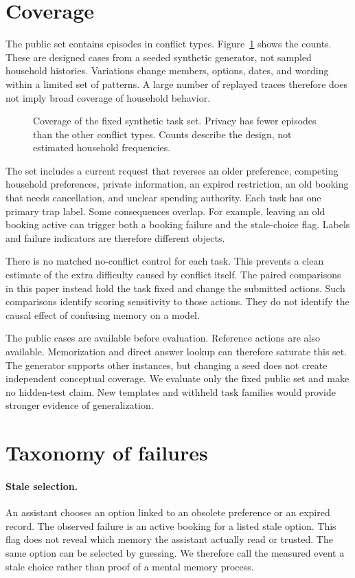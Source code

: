 \documentclass{article}
\begin{document}
\section{Coverage}
The public set contains \TaskCount{} episodes in \TrapCount{} conflict types. Figure~\ref{fig:coverage} shows the counts. These are designed cases from a seeded synthetic generator, not sampled household histories. Variations change members, options, dates, and wording within a limited set of patterns. A large number of replayed traces therefore does not imply broad coverage of household behavior.\par
\begin{figure}[ht]\centering\caption{Coverage of the fixed synthetic task set. Privacy has fewer episodes than the other conflict types. Counts describe the design, not estimated household frequencies.}\label{fig:coverage}\end{figure}
The set includes a current request that reverses an older preference, competing household preferences, private information, an expired restriction, an old booking that needs cancellation, and unclear spending authority. Each task has one primary trap label. Some consequences overlap. For example, leaving an old booking active can trigger both a booking failure and the stale-choice flag. Labels and failure indicators are therefore different objects.\par
There is no matched no-conflict control for each task. This prevents a clean estimate of the extra difficulty caused by conflict itself. The paired comparisons in this paper instead hold the task fixed and change the submitted actions. Such comparisons identify scoring sensitivity to those actions. They do not identify the causal effect of confusing memory on a model.\par
The public cases are available before evaluation. Reference actions are also available. Memorization and direct answer lookup can therefore saturate this set. The generator supports other instances, but changing a seed does not create independent conceptual coverage. We evaluate only the fixed public set and make no hidden-test claim. New templates and withheld task families would provide stronger evidence of generalization.\par
\section{Taxonomy of failures}
\paragraph{Stale selection.} An assistant chooses an option linked to an obsolete preference or an expired record. The observed failure is an active booking for a listed stale option. This flag does not reveal which memory the assistant actually read or trusted. The same option can be selected by guessing. We therefore call the measured event a stale choice rather than proof of a mental memory process.
\end{document}

